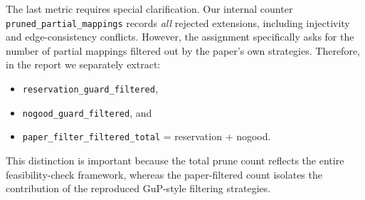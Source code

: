 The last metric requires special clarification. Our internal counter \texttt{pruned\_partial\_mappings} records \emph{all} rejected extensions, including injectivity and edge-consistency conflicts. However, the assignment specifically asks for the number of partial mappings filtered out by the paper's own strategies. Therefore, in the report we separately extract:
\begin{itemize}[nosep]
  \item \texttt{reservation\_guard\_filtered},
  \item \texttt{nogood\_guard\_filtered}, and
  \item \texttt{paper\_filter\_filtered\_total} = reservation + nogood.
\end{itemize}

This distinction is important because the total prune count reflects the entire feasibility-check framework, whereas the paper-filtered count isolates the contribution of the reproduced GuP-style filtering strategies.
